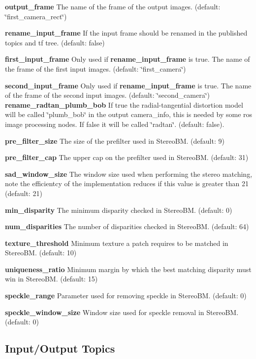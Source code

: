 \begin{DoxyItemize}
\item {\bfseries output\+\_\+frame} The name of the frame of the output images. (default\+: \char`\"{}first\+\_\+camera\+\_\+rect\char`\"{})
\item {\bfseries rename\+\_\+input\+\_\+frame} If the input frame should be renamed in the published topics and tf tree. (default\+: false)
\item {\bfseries first\+\_\+input\+\_\+frame} Only used if {\bfseries rename\+\_\+input\+\_\+frame} is true. The name of the frame of the first input images. (default\+: \char`\"{}first\+\_\+camera\char`\"{})
\item {\bfseries second\+\_\+input\+\_\+frame} Only used if {\bfseries rename\+\_\+input\+\_\+frame} is true. The name of the frame of the second input images. (default\+: \char`\"{}second\+\_\+camera\char`\"{}) {\bfseries rename\+\_\+radtan\+\_\+plumb\+\_\+bob} If true the radial-\/tangential distortion model will be called \char`\"{}plumb\+\_\+bob\char`\"{} in the output camera\+\_\+info, this is needed by some ros image processing nodes. If false it will be called \char`\"{}radtan\char`\"{}. (default\+: false).
\item {\bfseries pre\+\_\+filter\+\_\+size} The size of the prefilter used in Stereo\+BM. (default\+: 9)
\item {\bfseries pre\+\_\+filter\+\_\+cap} The upper cap on the prefilter used in Stereo\+BM. (default\+: 31)
\item {\bfseries sad\+\_\+window\+\_\+size} The window size used when performing the stereo matching, note the efficientcy of the implementation reduces if this value is greater than 21 (default\+: 21)
\item {\bfseries min\+\_\+disparity} The minimum disparity checked in Stereo\+BM. (default\+: 0)
\item {\bfseries num\+\_\+disparities} The number of disparities checked in Stereo\+BM. (default\+: 64)
\item {\bfseries texture\+\_\+threshold} Minimum texture a patch requires to be matched in Stereo\+BM. (default\+: 10)
\item {\bfseries uniqueness\+\_\+ratio} Minimum margin by which the best matching disparity must \textquotesingle{}win\textquotesingle{} in Stereo\+BM. (default\+: 15)
\item {\bfseries speckle\+\_\+range} Parameter used for removing speckle in Stereo\+BM. (default\+: 0)
\item {\bfseries speckle\+\_\+window\+\_\+size} Window size used for speckle removal in Stereo\+BM. (default\+: 0)
\end{DoxyItemize}\hypertarget{md_vision_layer_image_undistort_README_autotoc_md111}{}\subsection{Input/\+Output Topics}\label{md_vision_layer_image_undistort_README_autotoc_md111}
